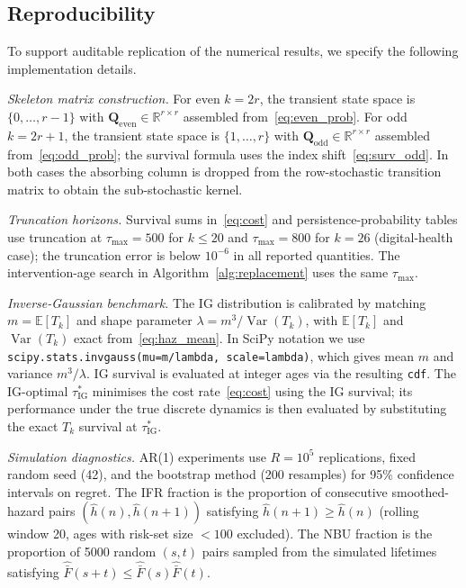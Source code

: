 \documentclass[pdflatex,sn-mathphys-num]{sn-jnl}
\theoremstyle{definition}
\DeclareMathOperator{\Var}{Var}
\newcommand{\E}{\mathbb{E}}
\numberwithin{equation}{section}
\begin{document}
\subsection{Reproducibility}\label{sec:reproducibility}

To support auditable replication of the numerical results, we specify the following implementation details.

\emph{Skeleton matrix construction.} For even $k=2r$, the transient state space is $\{0,\dots,r-1\}$ with $\mathbf{Q}_{\mathrm{even}}\in\mathbb{R}^{r\times r}$ assembled from~\eqref{eq:even_prob}. For odd $k=2r{+}1$, the transient state space is $\{1,\dots,r\}$ with $\mathbf{Q}_{\mathrm{odd}}\in\mathbb{R}^{r\times r}$ assembled from~\eqref{eq:odd_prob}; the survival formula uses the index shift~\eqref{eq:surv_odd}. In both cases the absorbing column is dropped from the row-stochastic transition matrix to obtain the sub-stochastic kernel.

\emph{Truncation horizons.} Survival sums in~\eqref{eq:cost} and persistence-probability tables use truncation at $\tau_{\max}=500$ for $k\le 20$ and $\tau_{\max}=800$ for $k=26$ (digital-health case); the truncation error is below $10^{-6}$ in all reported quantities. The intervention-age search in Algorithm~\ref{alg:replacement} uses the same $\tau_{\max}$.

\emph{Inverse-Gaussian benchmark.} The IG distribution is calibrated by matching $m = \E[T_k]$ and shape parameter $\lambda = m^3/\Var(T_k)$, with $\E[T_k]$ and $\Var(T_k)$ exact from~\eqref{eq:haz_mean}. In SciPy notation we use {\tt scipy.stats.invgauss(mu=m/lambda, scale=lambda)}, which gives mean $m$ and variance $m^3/\lambda$. IG survival is evaluated at integer ages via the resulting {\tt cdf}. The IG-optimal $\tau^*_{\mathrm{IG}}$ minimises the cost rate~\eqref{eq:cost} using the IG survival; its performance under the true discrete dynamics is then evaluated by substituting the exact $T_k$ survival at $\tau^*_{\mathrm{IG}}$.

\emph{Simulation diagnostics.} AR(1) experiments use $R=10^5$ replications, fixed random seed (42), and the bootstrap method (200 resamples) for 95\% confidence intervals on regret. The IFR fraction is the proportion of consecutive smoothed-hazard pairs $(\hat h(n),\hat h(n+1))$ satisfying $\hat h(n+1)\ge \hat h(n)$ (rolling window 20, ages with risk-set size $<100$ excluded). The NBU fraction is the proportion of 5000 random $(s,t)$ pairs sampled from the simulated lifetimes satisfying $\hat{\bar F}(s+t)\le \hat{\bar F}(s)\hat{\bar F}(t)$.
\end{document}
